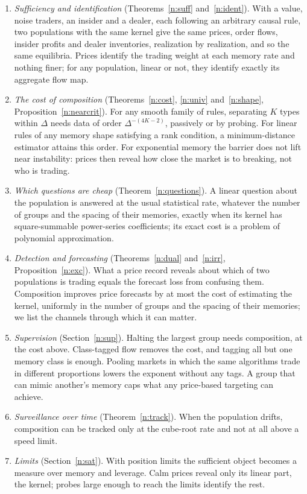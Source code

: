\begin{enumerate}[label=(\arabic*),leftmargin=*,itemsep=2pt]
\item \emph{Sufficiency and identification} (Theorems~\ref{n:suff} and~\ref{n:ident}). With a value, noise traders, an insider and a dealer, each following an arbitrary causal rule, two populations with the same kernel give the same prices, order flows, insider profits and dealer inventories, realization by realization, and so the same equilibria. Prices identify the trading weight at each memory rate and nothing finer; for any population, linear or not, they identify exactly its aggregate flow map.
\item \emph{The cost of composition} (Theorems~\ref{n:cost}, \ref{n:univ} and~\ref{n:shape}, Proposition~\ref{n:nearcrit}). For any smooth family of rules, separating $K$ types within $\Delta$ needs data of order $\Delta^{-(4K-2)}$, passively or by probing. For linear rules of any memory shape satisfying a rank condition, a minimum-distance estimator attains this order. For exponential memory the barrier does not lift near instability: prices then reveal how close the market is to breaking, not who is trading.
\item \emph{Which questions are cheap} (Theorem~\ref{n:questions}). A linear question about the population is answered at the usual statistical rate, whatever the number of groups and the spacing of their memories, exactly when its kernel has square-summable power-series coefficients; its exact cost is a problem of polynomial approximation.
\item \emph{Detection and forecasting} (Theorems~\ref{n:dual} and~\ref{n:irr}, Proposition~\ref{n:exc}). What a price record reveals about which of two populations is trading equals the forecast loss from confusing them. Composition improves price forecasts by at most the cost of estimating the kernel, uniformly in the number of groups and the spacing of their memories; we list the channels through which it can matter.
\item \emph{Supervision} (Section~\ref{n:sup}). Halting the largest group needs composition, at the cost above. Class-tagged flow removes the cost, and tagging all but one memory class is enough. Pooling markets in which the same algorithms trade in different proportions lowers the exponent without any tags. A group that can mimic another's memory caps what any price-based targeting can achieve.
\item \emph{Surveillance over time} (Theorem~\ref{n:track}). When the population drifts, composition can be tracked only at the cube-root rate and not at all above a speed limit.
\item \emph{Limits} (Section~\ref{n:sat}). With position limits the sufficient object becomes a measure over memory and leverage. Calm prices reveal only its linear part, the kernel; probes large enough to reach the limits identify the rest.
\end{enumerate}

